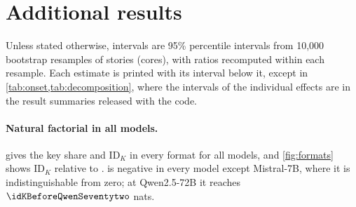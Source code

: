 \section{Additional results}\label{app:additional}

Unless stated otherwise, intervals are 95\% percentile intervals from 10{,}000 bootstrap resamples of stories (cores), with ratios recomputed within each resample. Each estimate is printed with its interval below it, except in \cref{tab:onset,tab:decomposition}, where the intervals of the individual effects are in the result summaries released with the code.

\paragraph{Natural factorial in all models.}  gives the \fmtOpt{} key share and $\mathrm{ID}_K$ in every format for all \nModels{} models, and \cref{fig:formats} shows $\mathrm{ID}_K$ relative to \fmtOpt{}. \fmtBefore{} is negative in every model except Mistral-7B, where it is indistinguishable from zero; at Qwen2.5-72B it reaches $\idKBeforeQwenSeventytwo$ nats.

\begin{table}[!ht]
\centering
\caption{\textbf{Natural factorial, all models.} Key share $s_K$ under \fmtOpt{} and value identity carried by keys, $\mathrm{ID}_K$ (nats), in each format, with keys and values clamped from layer~0. $n = 150$ stories per format and model; 95\% bootstrap CIs over stories (ratio recomputed in each resample for $s_K$). Models ordered by size. Rows up to 14B are from GPU stage 1, whose predictions B1--B2 cover \fmtOpt{}, \fmtLetter{} and \fmtNone{} in Qwen2.5-3B/7B, Qwen3-8B, Mistral-7B and OLMo-2-7B; rows from 24B are from stage 2, whose prediction C4 covers $s_K$ and \fmtBefore{}. The other cells, including the 1.5B and 14B rows, are exploratory; preregistration A tested 1.5B in a separate run (\cref{tab:prereg-ab}).}
\label{tab:natural}
\resizebox{\textwidth}{!}{}
\end{table}

